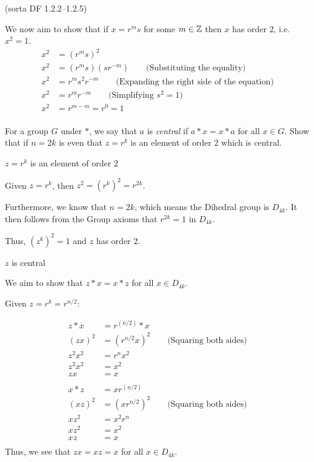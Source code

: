 \begin{problem}{\textsf{(sorta DF 1.2.2--1.2.5)}}
\begin{enumalph}
\begin{Answer}
    \bigskip
    \noindent
    We now aim to show that if $x = r^m s$ for some $m \in \mathbb{Z}$ then $x$ has order $2$, i.e. $x^2 = 1$.
    \begin{align*}
      x^2 &= {(r^m s)}^2 \\
      x^{2} &= (r^m s)(s r^{-m}) \qquad \text{(Substituting the equality)}\\
      x^{2} &= r^m s^2 r^{-m} \qquad \text{(Expanding the right side of the equation)}\\
      x^{2} &= r^m r^{-m} \qquad \text{(Simplifying $s^{2} = 1$)}\\
      x^{2} &= r^{m - m} = r^{0} = 1\\
    \end{align*}
  \end{Answer}
  \item For a group $G$ under $*$, we say that $a$ is \emph{central} if $a * x = x * 
  a$ for all $x \in G$.  Show that if $n=2k$ is even that $z=r^k$ is an element of 
  order $2$ which is central.
  \begin{Answer}
    \begin{enumalph}
      \item$z = r^k$ is an element of order $2$
      
      Given $z = r^k$, then $z^{2} = {(r^k)}^{2} = r^{2k}$.

      \noindent
      Furthermore, we know that $n = 2k$, which means the Dihedral group is
       $D_{4k}$.  It then follows from the Group axioms that $r^{2k} = 1$ in $D_{4k}$.

       \noindent
       Thus, $(z^{k})^2 = 1$ and $z$ has order $2$.

       \item $z$ is central
      
       \noindent
        We aim to show that $z * x = x * z$ for all $x \in D_{4k}$.
      
        \noindent
        Given $z = r^{k} = r^{n/2}$:

        \begin{align*}
          z * x &= r^{(n/2)} * x \\
          {(zx)}^{2} &= (r^{n/2} x)^{2} \qquad \text{(Squaring both sides)} \\
          z^2x^2 &= r^n x^2 \\
          z^2x^2 &= x^2\\
          zx &= x\\
          \\
          x * z &= x r^{(n/2)} \\
          {(xz)}^{2} &= {(xr^{n/2})}^{2} \qquad \text{(Squaring both sides)} \\
          {xz}^2 &= x^2 r^n \\
          {xz}^2 &= x^2\\
          xz &= x\\
        \end{align*}
        Thus, we see that $zx = xz = x$ for all $x \in D_{4k}$.


\end{enumalph}
\end{Answer}
\end{enumalph}
\end{problem}
